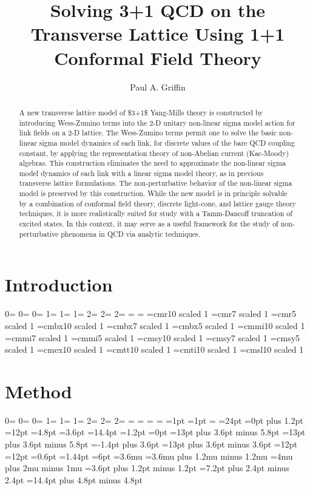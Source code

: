 \documentclass[11pt]{article}
\title{Solving 3+1 QCD on the Transverse Lattice Using 1+1 Conformal Field
  Theory}
\author{Paul A. Griffin}
\date{}
\begin{document}
\maketitle
\begin{abstract}

A new transverse lattice model of \$3+1\$ Yang-Mills theory is constructed by introducing Wess-Zumino terms into the 2-D unitary non-linear sigma model action for link fields on a 2-D lattice. The Wess-Zumino terms permit one to solve the basic non-linear sigma model dynamics of each link, for discrete values of the bare QCD coupling constant, by applying the representation theory of non-Abelian current (Kac-Moody) algebras. This construction eliminates the need to approximate the non-linear sigma model dynamics of each link with a linear sigma model theory, as in previous transverse lattice formulations. The non-perturbative behavior of the non-linear sigma model is preserved by this construction. While the new model is in principle solvable by a combination of conformal field theory, discrete light-cone, and lattice gauge theory techniques, it is more realistically suited for study with a Tamm-Dancoff truncation of excited states. In this context, it may serve as a useful framework for the study of non-perturbative phenomena in QCD via analytic techniques.

\end{abstract}

\section{Introduction}

0= 0= 0= 1= 1= 1= 2= 2= 2= = = =cmr10 scaled 1 =cmr7 scaled 1 =cmr5 scaled 1 =cmbx10 scaled 1 =cmbx7 scaled 1 =cmbx5 scaled 1 =cmmi10 scaled 1 =cmmi7 scaled 1 =cmmi5 scaled 1 =cmsy10 scaled 1 =cmsy7 scaled 1 =cmsy5 scaled 1 =cmex10 scaled 1 =cmtt10 scaled 1 =cmti10 scaled 1 =cmsl10 scaled 1

\section{Method}

0= 0= 0= 1= 1= 1= 2= 2= 2= = = = = =1pt =1pt = =24pt =0pt plus 1.2pt =12pt =4.8pt =3.6pt =14.4pt =1.2pt =0pt =13pt plus 3.6pt minus 5.8pt =13pt plus 3.6pt minus 5.8pt =-1.4pt plus 3.6pt =13pt plus 3.6pt minus 3.6pt =12pt =12pt =0.6pt =1.44pt =6pt =3.6mu =3.6mu plus 1.2mu minus 1.2mu =4mu plus 2mu minus 1mu =3.6pt plus 1.2pt minus 1.2pt =7.2pt plus 2.4pt minus 2.4pt =14.4pt plus 4.8pt minus 4.8pt
\end{document}
